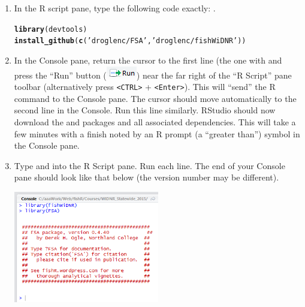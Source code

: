 \documentclass{article}\usepackage[]{graphicx}\usepackage[]{color}
\makeatletter
\newcommand{\hlstr}[1]{\textcolor[rgb]{0.192,0.494,0.8}{#1}}%
\newcommand{\hlstd}[1]{\textcolor[rgb]{0.345,0.345,0.345}{#1}}%
\newcommand{\hlkwd}[1]{\textcolor[rgb]{0.737,0.353,0.396}{\textbf{#1}}}%
\newenvironment{kframe}{%
 \def\at@end@of@kframe{}%
 \ifinner\ifhmode%
  \def\at@end@of@kframe{\end{minipage}}%
  \begin{minipage}{\columnwidth}%
 \fi\fi%
 \def\FrameCommand##1{\hskip\@totalleftmargin \hskip-\fboxsep
 \colorbox{shadecolor}{##1}\hskip-\fboxsep
     \hskip-\linewidth \hskip-\@totalleftmargin \hskip\columnwidth}%
 \MakeFramed {\advance\hsize-\width
   \@totalleftmargin\z@ \linewidth\hsize
   \@setminipage}}%
 {\par\unskip\endMakeFramed%
 \at@end@of@kframe}
\newenvironment{knitrout}{}{} %
\makeatother
\begin{document}
\begin{enumerate}
  \item In the R script pane, type the following code exactly: .
\begin{knitrout}
\color{fgcolor}\begin{kframe}
\begin{alltt}
\hlkwd{library}\hlstd{(devtools)}
\hlkwd{install_github}\hlstd{(}\hlkwd{c}\hlstd{(}\hlstr{'droglenc/FSA'}\hlstd{,}\hlstr{'droglenc/fishWiDNR'}\hlstd{))}
\end{alltt}
\end{kframe}
\end{knitrout}
\vspace{12pt}
  \item In the Console pane, return the cursor to the first line (the one with  and press the ``Run'' button (\includegraphics[scale=0.8]{Figs/RStudio_Icon_Run.png}) near the far right of the ``R Script'' pane toolbar (alternatively press \verb+<CTRL>+ + \verb+<Enter>+).  This will ``send'' the R command to the Console pane.  The cursor should move automatically to the second line in the Console.  Run this line similarly.  RStudio should now download  the  and  packages and all associated dependencies.  This will take a few minutes with a finish noted by an R prompt (a ``greater than'') symbol in the Console pane.
  \item Type  and  into the R Script pane.  Run each line.  The end of your Console pane should look like that below (the version number may be different).
\begin{center}
  \includegraphics[width=2.5in]{Figs/RStudio_Prep_FSA.png}
\end{center}


\end{enumerate}
\end{document}

